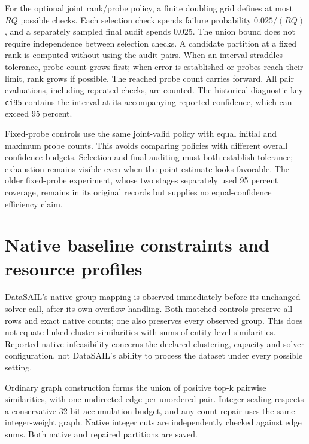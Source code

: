 \documentclass[12pt]{article}
\begin{document}
For the optional joint rank/probe policy, a finite doubling grid defines at most
$R Q$ possible checks. Each selection check spends failure probability
$0.025/(RQ)$, and a separately sampled final audit spends 0.025.
The union bound does not require independence between selection checks.
A candidate partition at a fixed rank is computed without using the audit pairs.
When an interval straddles tolerance, probe count grows first; when error is
established or probes reach their limit, rank grows if possible. The reached
probe count carries forward. All pair evaluations, including repeated checks,
are counted. The historical diagnostic key \texttt{ci95} contains the interval
at its accompanying reported confidence, which can exceed 95 percent.

Fixed-probe controls use the same joint-valid policy with equal initial and
maximum probe counts. This avoids comparing policies with different overall
confidence budgets. Selection and final auditing must both establish tolerance;
exhaustion remains visible even when the point estimate looks favorable.
The older fixed-probe experiment, whose two stages separately used 95 percent
coverage, remains in its original records but supplies no equal-confidence
efficiency claim.



\section{Native baseline constraints and resource profiles}

DataSAIL's native group mapping is observed immediately before its unchanged
solver call, after its own overflow handling. Both matched controls preserve
all rows and exact native counts; one also preserves every observed group.
This does not equate linked cluster similarities with sums of entity-level
similarities. Reported native infeasibility concerns the declared clustering,
capacity and solver configuration, not DataSAIL's ability to process the dataset
under every possible setting.




Ordinary graph construction forms the union of positive top-k pairwise
similarities, with one undirected edge per unordered pair. Integer scaling
respects a conservative 32-bit accumulation budget, and any count repair uses
the same integer-weight graph. Native integer cuts are independently checked
against edge sums. Both native and repaired partitions are saved.
\end{document}

